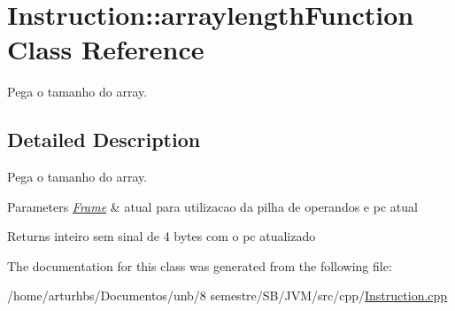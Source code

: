 \hypertarget{classInstruction_1_1arraylengthFunction}{}\section{Instruction\+:\+:arraylength\+Function Class Reference}
\label{classInstruction_1_1arraylengthFunction}


Pega o tamanho do array.  




\subsection{Detailed Description}
Pega o tamanho do array. 


\begin{DoxyParams}{Parameters}
{\em \hyperlink{classFrame}{Frame}} & atual para utilizacao da pilha de operandos e pc atual \\
\hline
\end{DoxyParams}
\begin{DoxyReturn}{Returns}
inteiro sem sinal de 4 bytes com o pc atualizado 
\end{DoxyReturn}


The documentation for this class was generated from the following file\+:\begin{DoxyCompactItemize}
\item 
/home/arturhbs/\+Documentos/unb/8 semestre/\+S\+B/\+J\+V\+M/src/cpp/\hyperlink{Instruction_8cpp}{Instruction.\+cpp}\end{DoxyCompactItemize}
